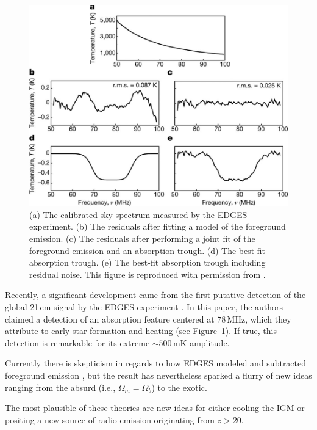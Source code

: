 \begin{bibunit}
\begin{figure}[t]
    \centering
    \includegraphics[width=\textwidth]{figures/chapter1/bowman-2018-absorption-trough}
    \caption{
        (a) The calibrated sky spectrum measured by the EDGES experiment.
        (b) The residuals after fitting a model of the foreground emission.
        (c) The residuals after performing a joint fit of the foreground emission and an absorption
        trough.
        (d) The best-fit absorption trough.
        (e) The best-fit absorption trough including residual noise.
        This figure is reproduced with permission from \citet{2018Natur.555...67B}.
    }
    \label{fig:bowman-absorption-trough}
\end{figure}

Recently, a significant development came from the first putative detection of the global 21\,cm
signal by the EDGES experiment \citep{2018Natur.555...67B}. In this paper, the authors claimed a
detection of an absorption feature centered at $78\,\text{MHz}$, which they attribute to early star
formation and heating (see Figure~\ref{fig:bowman-absorption-trough}). If true, this detection is
remarkable for its extreme $\sim500\,\text{mK}$ amplitude.

Currently there is skepticism in regards to how EDGES modeled and subtracted foreground emission
\citep{2018arXiv180501421H}, but the result has nevertheless sparked a flurry of new ideas ranging
from the absurd (i.e., $\Omega_m = \Omega_b$) to the exotic.

The most plausible of these theories are new ideas for either cooling the IGM or positing a new
source of radio emission originating from $z > 20$.


\end{bibunit}
